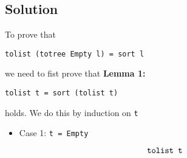 \subsection*{Solution}

To prove that
\begin{center}
    \texttt{tolist (totree Empty l) = sort l}
\end{center}
we need to fist prove that
\textbf{Lemma 1:}
\begin{center}
    \texttt{tolist t = sort (tolist t)}
\end{center}
holds. We do this by induction on \texttt{t}
\begin{itemize}
    \item {
        Case 1: \texttt{t = Empty}

        \begin{displaymath}
            \texttt{tolist t} \\
        \end{displaymath}
    }
\end{itemize}